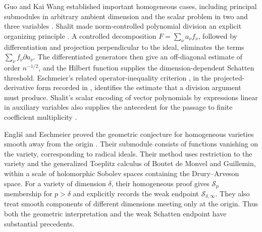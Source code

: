 \documentclass[11pt,reqno]{amsart}
\theoremstyle{remark}
\newcommand{\cS}{\mathcal S}
\begin{document}
Guo and Kai Wang established important homogeneous cases, including
principal submodules in arbitrary ambient dimension and the scalar
problem in two and three variables \cite{GuoWang}. Shalit made
norm-controlled polynomial division an explicit organizing principle
\cite{ShalitDivision}. A controlled decomposition
$F=\sum_\nu a_\nu f_\nu$, followed by differentiation and projection
perpendicular to the ideal, eliminates the terms
$\sum_\nu f_\nu\partial a_\nu$. The differentiated generators then
give an off-diagonal estimate of order $n^{-1/2}$, and the Hilbert
function supplies the dimension-dependent Schatten threshold.
Eschmeier's related operator-inequality criterion
\cite{EschmeierCriterion}, in the projected-derivative form recorded
in \cite[Section~6, equation~(6.1)]{ShalitDivision}, identifies the
estimate that a division argument must produce.
Shalit's scalar encoding of vector polynomials by expressions linear
in auxiliary variables also supplies the antecedent for the passage
to finite coefficient multiplicity
\cite[Section~5, equation~(5.1)]{ShalitDivision}.

Engli\v{s} and Eschmeier proved the geometric conjecture for homogeneous
varieties smooth away from the origin \cite{EnglisEschmeier}. Their
submodule consists of functions vanishing on the variety, corresponding
to radical ideals. Their method uses restriction to the variety and
the generalized Toeplitz calculus of Boutet de Monvel and Guillemin,
within a scale of holomorphic Sobolev spaces containing the
Drury--Arveson space. For a variety of dimension $\delta$, their
homogeneous proof gives $\cS_p$ membership for $p>\delta$ and explicitly
records the weak endpoint $\cS_{\delta,\infty}$. They also treat smooth
components of different dimensions meeting only at the origin. Thus
both the geometric interpretation and the weak Schatten endpoint have
substantial precedents.
\end{document}
